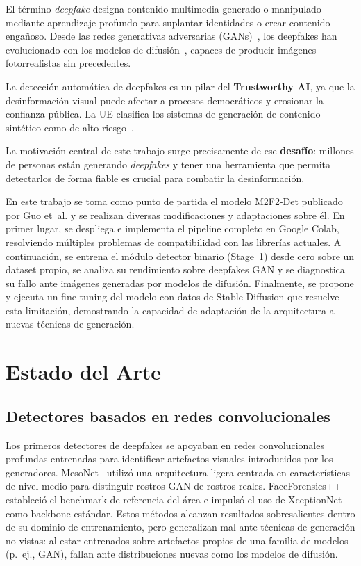 \documentclass[pdflatex,sn-mathphys-num]{sn-jnl}
\begin{document}
El término \emph{deepfake} designa contenido multimedia generado o manipulado mediante aprendizaje profundo para suplantar identidades o crear contenido engañoso. Desde las redes generativas adversarias (GANs)~\cite{goodfellow2014generative}, los deepfakes han evolucionado con los modelos de difusión~\cite{rombach2022latentdiffusion}, capaces de producir imágenes fotorrealistas sin precedentes.

La detección automática de deepfakes es un pilar del \textbf{Trustworthy AI}, ya que la desinformación visual puede afectar a procesos democráticos y erosionar la confianza pública. La UE clasifica los sistemas de generación de contenido sintético como de alto riesgo~\cite{euaiact2024}.

La motivación central de este trabajo surge precisamente de ese \textbf{desafío}: millones de personas están generando \emph{deepfakes} y tener una herramienta que permita detectarlos de forma fiable es crucial para combatir la desinformación. 

En este trabajo se toma como punto de partida el modelo M2F2-Det publicado por Guo et~al. y se realizan diversas modificaciones y adaptaciones sobre él. En primer lugar, se despliega e implementa el pipeline completo en Google Colab, resolviendo múltiples problemas de compatibilidad con las librerías actuales. A continuación, se entrena el módulo detector binario (Stage~1) desde cero sobre un dataset propio, se analiza su rendimiento sobre deepfakes GAN y se diagnostica su fallo ante imágenes generadas por modelos de difusión. Finalmente, se propone y ejecuta un fine-tuning del modelo con datos de Stable Diffusion que resuelve esta limitación, demostrando la capacidad de adaptación de la arquitectura a nuevas técnicas de generación.


\section{Estado del Arte}\label{sec:sota}

\subsection{Detectores basados en redes convolucionales}

Los primeros detectores de deepfakes se apoyaban en redes convolucionales profundas entrenadas para identificar artefactos visuales introducidos por los generadores. MesoNet~\cite{afchar2018mesonet} utilizó una arquitectura ligera centrada en características de nivel medio para distinguir rostros GAN de rostros reales. FaceForensics++~\cite{rossler2019ff} estableció el benchmark de referencia del área e impulsó el uso de XceptionNet como backbone estándar. Estos métodos alcanzan resultados sobresalientes dentro de su dominio de entrenamiento, pero generalizan mal ante técnicas de generación no vistas: al estar entrenados sobre artefactos propios de una familia de modelos (p.~ej., GAN), fallan ante distribuciones nuevas como los modelos de difusión.
\end{document}
